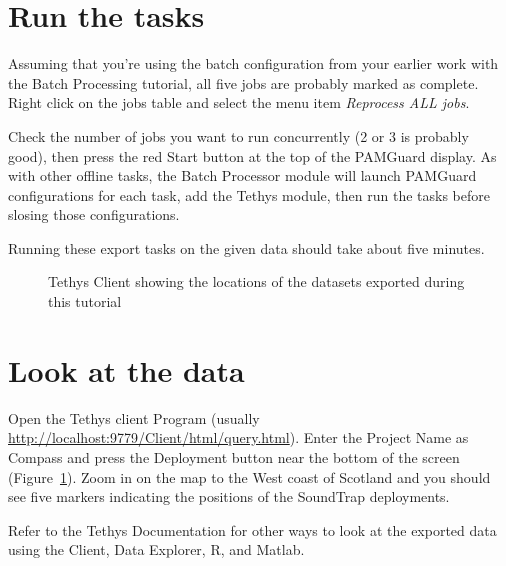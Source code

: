 \documentclass[
]{article}
\begin{document}
\section{Run the tasks}\label{run-the-tasks}

Assuming that you're using the batch configuration from your earlier
work with the Batch Processing tutorial, all five jobs are probably
marked as complete. Right click on the jobs table and select the menu
item \emph{Reprocess ALL jobs}.

Check the number of jobs you want to run concurrently (2 or 3 is
probably good), then press the red Start button at the top of the
PAMGuard display. As with other offline tasks, the Batch Processor
module will launch PAMGuard configurations for each task, add the Tethys
module, then run the tasks before slosing those configurations.

Running these export tasks on the given data should take about five
minutes.

\begin{figure}


\caption{\label{fig-client}Tethys Client showing the locations of the
datasets exported during this tutorial}

\end{figure}%

\section{Look at the data}\label{look-at-the-data}

Open the Tethys client Program (usually
\url{http://localhost:9779/Client/html/query.html}). Enter the Project
Name as Compass and press the Deployment button near the bottom of the
screen (Figure~\ref{fig-client}). Zoom in on the map to the West coast
of Scotland and you should see five markers indicating the positions of
the SoundTrap deployments.

Refer to the Tethys Documentation for other ways to look at the exported
data using the Client, Data Explorer, R, and Matlab.
\end{document}
